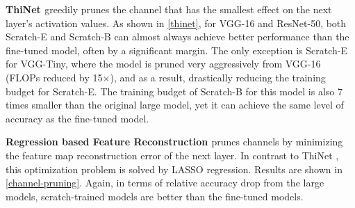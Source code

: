 \textbf{ThiNet \citep{luo2017thinet}} greedily prunes the channel that has the smallest effect on the next layer's activation values.  As shown in \autoref{thinet}, for VGG-16 and ResNet-50, both Scratch-E and Scratch-B can almost always achieve better performance than the fine-tuned model, often by a significant margin. The only exception is Scratch-E for VGG-Tiny, where the model is pruned very aggressively from VGG-16 (FLOPs reduced by 15$\times$), and as a result, drastically reducing the training budget for Scratch-E. The training budget of Scratch-B for this model is also 7 times smaller than the original large model, yet it can achieve the same level of accuracy as the fine-tuned model.


\textbf{Regression based Feature Reconstruction \citep{he2017channel}} prunes channels by minimizing the feature map reconstruction error of the next layer. In contrast to ThiNet \citep{luo2017thinet}, this optimization problem is solved by LASSO regression. Results are shown in \autoref{channel-pruning}. Again, in terms of relative accuracy drop from the large models, scratch-trained models are better than the fine-tuned models.


